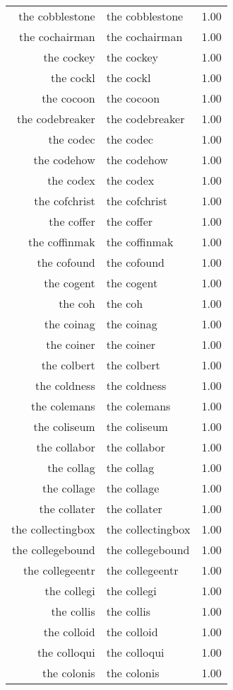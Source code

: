 \begin{table}[ht]
\begin{tabular}{rlr}
  the cobblestone & the cobblestone & 1.00 \\ 
  the cochairman & the cochairman & 1.00 \\ 
  the cockey & the cockey & 1.00 \\ 
  the cockl & the cockl & 1.00 \\ 
  the cocoon & the cocoon & 1.00 \\ 
  the codebreaker & the codebreaker & 1.00 \\ 
  the codec & the codec & 1.00 \\ 
  the codehow & the codehow & 1.00 \\ 
  the codex & the codex & 1.00 \\ 
  the cofchrist & the cofchrist & 1.00 \\ 
  the coffer & the coffer & 1.00 \\ 
  the coffinmak & the coffinmak & 1.00 \\ 
  the cofound & the cofound & 1.00 \\ 
  the cogent & the cogent & 1.00 \\ 
  the coh & the coh & 1.00 \\ 
  the coinag & the coinag & 1.00 \\ 
  the coiner & the coiner & 1.00 \\ 
  the colbert & the colbert & 1.00 \\ 
  the coldness & the coldness & 1.00 \\ 
  the colemans & the colemans & 1.00 \\ 
  the coliseum & the coliseum & 1.00 \\ 
  the collabor & the collabor & 1.00 \\ 
  the collag & the collag & 1.00 \\ 
  the collage & the collage & 1.00 \\ 
  the collater & the collater & 1.00 \\ 
  the collectingbox & the collectingbox & 1.00 \\ 
  the collegebound & the collegebound & 1.00 \\ 
  the collegeentr & the collegeentr & 1.00 \\ 
  the collegi & the collegi & 1.00 \\ 
  the collis & the collis & 1.00 \\ 
  the colloid & the colloid & 1.00 \\ 
  the colloqui & the colloqui & 1.00 \\ 
  the colonis & the colonis & 1.00 \\ 

\end{tabular}
\end{table}
